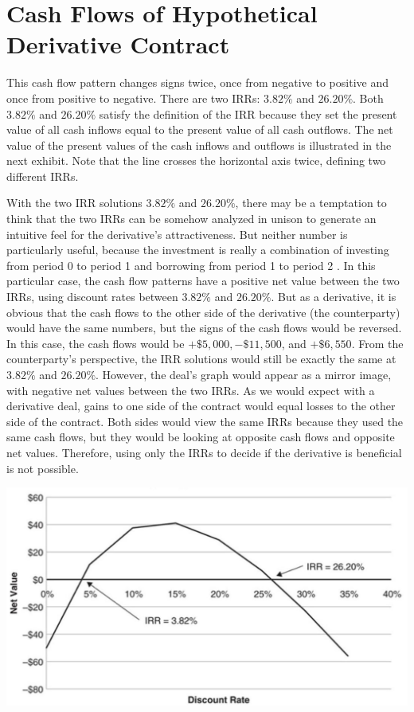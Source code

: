 \documentclass[11pt]{article}
\begin{document}
\section*{Cash Flows of Hypothetical Derivative Contract}
This cash flow pattern changes signs twice, once from negative to positive and once from positive to negative. There are two IRRs: $3.82 \%$ and $26.20 \%$. Both $3.82 \%$ and $26.20 \%$ satisfy the definition of the IRR because they set the present value of all cash inflows equal to the present value of all cash outflows. The net value of the present values of the cash inflows and outflows is illustrated in the next exhibit. Note that the line crosses the horizontal axis twice, defining two different IRRs.

With the two IRR solutions $3.82 \%$ and $26.20 \%$, there may be a temptation to think that the two IRRs can be somehow analyzed in unison to generate an intuitive feel for the derivative's attractiveness. But neither number is particularly useful, because the investment is really a combination of investing from period 0 to period 1 and borrowing from period 1 to period 2 . In this particular case, the cash flow patterns have a positive net value between the two IRRs, using discount rates between $3.82 \%$ and $26.20 \%$. But as a derivative, it is obvious that the cash flows to the other side of the derivative (the counterparty) would have the same numbers, but the signs of the cash flows would be reversed. In this case, the cash flows would be $+\$ 5,000,-\$ 11,500$, and $+\$ 6,550$. From the counterparty's perspective, the IRR solutions would still be exactly the same at $3.82 \%$ and $26.20 \%$. However, the deal's graph would appear as a mirror image, with negative net values between the two IRRs. As we would expect with a derivative deal, gains to one side of the contract would equal losses to the other side of the contract. Both sides would view the same IRRs because they used the same cash flows, but they would be looking at opposite cash flows and opposite net values. Therefore, using only the IRRs to decide if the derivative is beneficial is not possible.

\begin{center}
\includegraphics[max width=\textwidth]{2024_04_10_6f0546190ca30f08bc91g-3}
\end{center}
\end{document}

